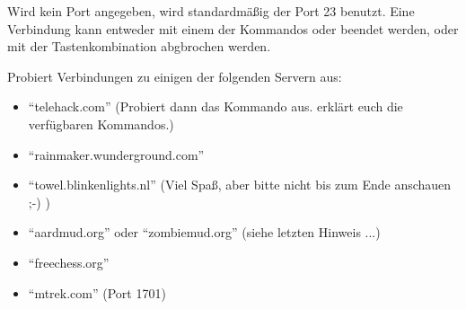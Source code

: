 \documentclass[10pt, a4paper]{scrartcl}
\begin{document}
\begin{aufgabe}
	Wird kein Port angegeben, wird standardmäßig der Port 23 benutzt. Eine Verbindung kann entweder mit einem der Kommandos  oder  beendet werden, oder mit der Tastenkombination  abgbrochen werden.
	
	Probiert  Verbindungen zu einigen der folgenden Servern aus:
	
	\begin{itemize}
		\item \enquote{telehack.com} (Probiert dann das Kommando  aus.  erklärt euch die verfügbaren Kommandos.)
		\item \enquote{rainmaker.wunderground.com}
		\item  \enquote{towel.blinkenlights.nl} (Viel Spaß, aber bitte nicht bis zum Ende anschauen ;-) )
		\item \enquote{aardmud.org} oder \enquote{zombiemud.org} (siehe letzten Hinweis ...)
		\item \enquote{freechess.org}
		\item \enquote{mtrek.com} (Port 1701)
	\end{itemize}
\end{aufgabe}
\end{document}
